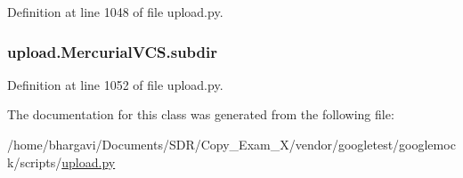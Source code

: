 Definition at line 1048 of file upload.\+py.

\subsubsection[{\texorpdfstring{subdir}{subdir}}]{\setlength{\rightskip}{0pt plus 5cm}upload.\+Mercurial\+V\+C\+S.\+subdir}\hypertarget{classupload_1_1_mercurial_v_c_s_a0dad32e621f5523e3430d867184f0b42}{}\label{classupload_1_1_mercurial_v_c_s_a0dad32e621f5523e3430d867184f0b42}


Definition at line 1052 of file upload.\+py.



The documentation for this class was generated from the following file\+:\begin{DoxyCompactItemize}
\item 
/home/bhargavi/\+Documents/\+S\+D\+R/\+Copy\+\_\+\+Exam\+\_\+X/vendor/googletest/googlemock/scripts/\hyperlink{googlemock_2scripts_2upload_8py}{upload.\+py}\end{DoxyCompactItemize}
